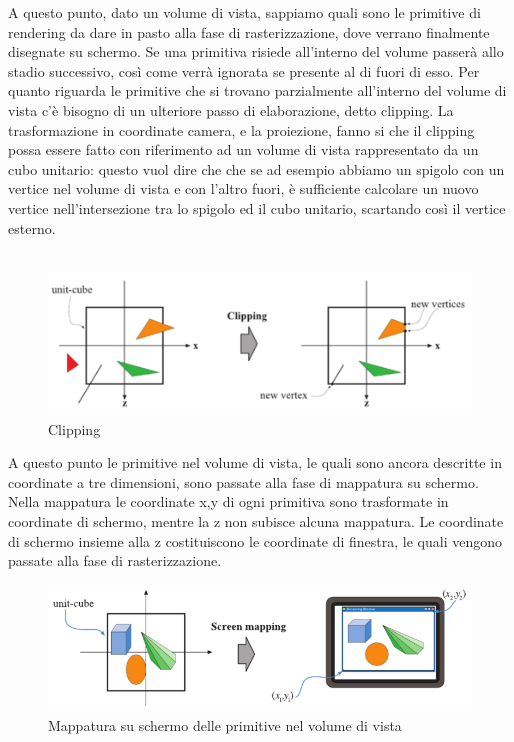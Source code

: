 A questo punto, dato un volume di vista, sappiamo quali sono le primitive di rendering da dare in pasto alla fase di rasterizzazione, dove verrano finalmente disegnate su schermo.
Se una primitiva risiede all’interno del volume passerà allo stadio successivo, così come verrà ignorata se presente al di fuori di esso. Per quanto riguarda le primitive che si trovano parzialmente all’interno del volume di vista c’è bisogno di un ulteriore passo di elaborazione, detto clipping. La trasformazione in coordinate camera, e la proiezione, fanno si che il clipping possa essere fatto con riferimento ad un volume di vista rappresentato da un cubo unitario: questo vuol dire che che se ad esempio abbiamo un spigolo con un vertice nel volume di vista e con l’altro fuori, è sufficiente calcolare un nuovo vertice nell’intersezione tra lo spigolo ed il cubo unitario, scartando così il vertice esterno.\\
\\
\begin{figure}[htb]
 \centering
 \includegraphics[width=1.0\linewidth]{images/chapter_stato_arte/stato_arte_clipping.png}\hfill
 \caption[Clipping]{Clipping}
 \label{fig:stato_arte_clipping}
\end{figure}

A questo punto le primitive nel volume di vista, le quali sono ancora descritte in coordinate a tre dimensioni, sono passate alla fase di mappatura su schermo. 
Nella mappatura le coordinate x,y di ogni primitiva sono trasformate in coordinate di schermo, mentre la z non subisce alcuna mappatura.
Le coordinate di schermo insieme alla z costituiscono le coordinate di finestra, le quali vengono passate alla fase di rasterizzazione.
\\
\begin{figure}[htb]
 \centering
 \includegraphics[width=1.0\linewidth]{images/chapter_stato_arte/stato_arte_mapping.png}\hfill
 \caption[Mappatura su schermo]{Mappatura su schermo delle primitive nel volume di vista}
 \label{fig:stato_arte_mapping}
\end{figure}

